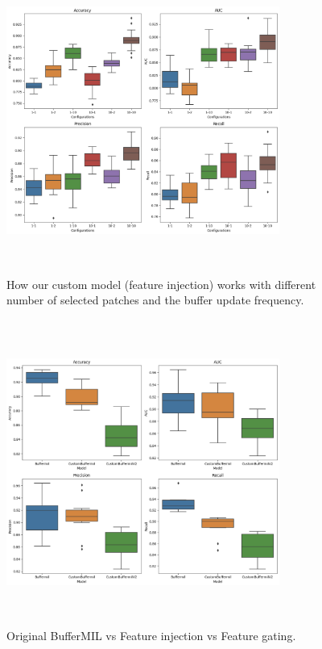 \documentclass[10pt,twocolumn]{article}
\begin{document}
\begin{figure}[!htb]
    \centering
    \includegraphics[width=0.8\textwidth, height=10cm]{images/comparison_ntop_bufffreq.png}
    \caption{How our custom model (feature injection) works with different number of selected patches and the buffer update frequency.}
    \label{fig:comaprison_ntop_buffreq}
\end{figure}

\begin{figure}[!tb]
    \centering
    \includegraphics[width=0.8\textwidth, height=10cm]{images/comparison_between_all.png}
    \caption{Original BufferMIL vs Feature injection vs Feature gating.}
    \label{fig:comaprison_ntop_buffreq}
\end{figure}
\end{document}
